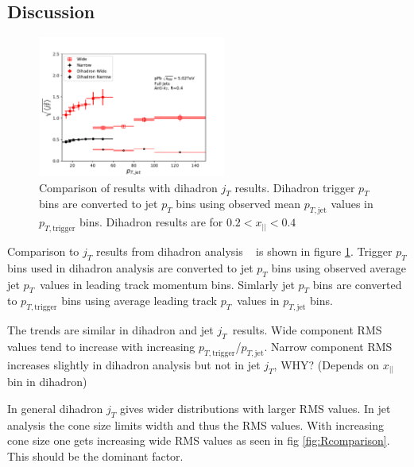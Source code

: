 \subsection{Discussion}
\begin{figure}[htb]
\centering
\includegraphics[width=0.55\textwidth]{figures/results/RMSWithSystematics_DihadronJetPt}
\caption{Comparison of results with dihadron $j_T$ results. Dihadron trigger $p_T$ bins are converted to jet $p_T$  bins  using observed mean  $p_{T,\mathrm{jet}}$ values in $p_{T,\mathrm{trigger}}$ bins. Dihadron results are for $0.2 < x_{||} < 0.4$ }
\label{fig:DihadronComparison}
\end{figure}

Comparison to $j_T$ results from dihadron analysis ~\cite{ALICEjt} is shown in figure \ref{fig:DihadronComparison}. Trigger $p_T$ bins used in dihadron analysis are converted to jet $p_T$ bins using observed average jet $p_T$ values in leading track momentum bins. Simlarly jet $p_T$ bins are converted to $p_{T,\mathrm{trigger}}$ bins using average leading track $p_T$ values in $p_{T,\mathrm{jet}}$ bins.

The trends are similar in dihadron and jet $j_T$ results. Wide component RMS values tend to increase with increasing $p_{T,\mathrm{trigger}}$/$p_{T,\mathrm{jet}}$. Narrow component RMS increases slightly in dihadron analysis but not in jet $j_T$, WHY? (Depends on $x_{||}$ bin in dihadron)

In general dihadron $j_T$ gives wider distributions with larger RMS values. In jet analysis the cone size limits width and thus the RMS values. With increasing cone size one gets increasing wide RMS values as seen in fig \ref{fig:Rcomparison}. This should be the dominant factor.

